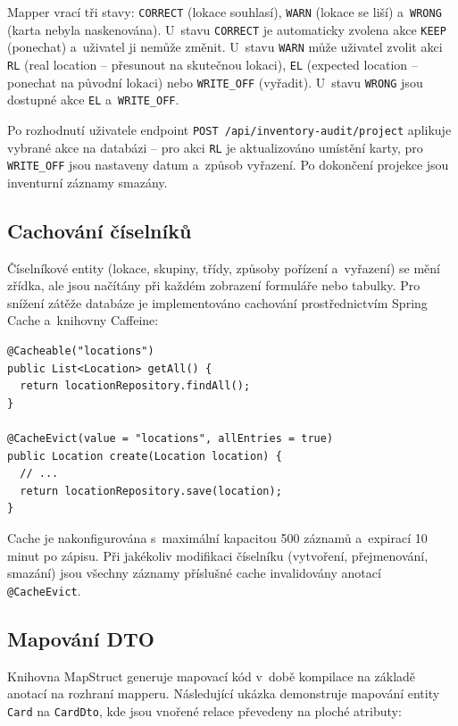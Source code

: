Mapper vrací tři stavy: \texttt{CORRECT} (lokace souhlasí), \texttt{WARN} (lokace se liší) a~\texttt{WRONG} (karta nebyla naskenována). U~stavu \texttt{CORRECT} je automaticky zvolena akce \texttt{KEEP} (ponechat) a~uživatel ji nemůže změnit. U~stavu \texttt{WARN} může uživatel zvolit akci \texttt{RL} (real location -- přesunout na skutečnou lokaci), \texttt{EL} (expected location -- ponechat na původní lokaci) nebo \texttt{WRITE\_OFF} (vyřadit). U~stavu \texttt{WRONG} jsou dostupné akce \texttt{EL} a~\texttt{WRITE\_OFF}.

Po rozhodnutí uživatele endpoint \texttt{POST /api/inventory-audit/project} aplikuje vybrané akce na databázi -- pro akci \texttt{RL} je aktualizováno umístění karty, pro \texttt{WRITE\_OFF} jsou nastaveny datum a~způsob vyřazení. Po dokončení projekce jsou inventurní záznamy smazány.

\subsection{Cachování číselníků}

Číselníkové entity (lokace, skupiny, třídy, způsoby pořízení a~vyřazení) se mění zřídka, ale jsou načítány při každém zobrazení formuláře nebo tabulky. Pro snížení zátěže databáze je implementováno cachování prostřednictvím Spring Cache a~knihovny Caffeine:

\begin{listing}[H]
\caption{Cachování číselníkových dat}\label{lst:cache}
\begin{verbatim}
@Cacheable("locations")
public List<Location> getAll() {
  return locationRepository.findAll();
}

@CacheEvict(value = "locations", allEntries = true)
public Location create(Location location) {
  // ...
  return locationRepository.save(location);
}
\end{verbatim}
\end{listing}

Cache je nakonfigurována s~maximální kapacitou 500 záznamů a~expirací 10 minut po zápisu. Při jakékoliv modifikaci číselníku (vytvoření, přejmenování, smazání) jsou všechny záznamy příslušné cache invalidovány anotací \texttt{@CacheEvict}.

\subsection{Mapování DTO}

Knihovna MapStruct generuje mapovací kód v~době kompilace na základě anotací na rozhraní mapperu. Následující ukázka demonstruje mapování entity \texttt{Card} na \texttt{CardDto}, kde jsou vnořené relace převedeny na ploché atributy:


